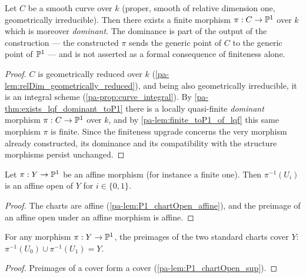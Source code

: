 \begin{theorem}
  \label{pa-thm:exists_finite_dominant_toP1}
  \leanok

  Let \(C\) be a smooth curve over \(k\) (proper, smooth of relative dimension one,
  geometrically irreducible). Then there exists a finite morphism \(\pi : C \to \mathbb{P}^1\)
  over \(k\) which is moreover \emph{dominant}. The dominance is part of the output of the
  construction --- the constructed \(\pi\) sends the generic point of \(C\) to the generic
  point of \(\mathbb{P}^1\) --- and is not asserted as a formal consequence of finiteness alone.
\end{theorem}
\begin{proof}
  \leanok
  \(C\) is geometrically reduced over \(k\) (\ref{pa-lem:relDim_geometrically_reduced}), and
  being also geometrically irreducible, it is an integral scheme
  (\ref{pa-prop:curve_integral}). By \ref{pa-thm:exists_lqf_dominant_toP1} there is a locally
  quasi-finite \emph{dominant} morphism \(\pi : C \to \mathbb{P}^1\) over \(k\), and by
  \ref{pa-lem:finite_toP1_of_lqf} this same morphism \(\pi\) is finite. Since the finiteness
  upgrade concerns the very morphism already constructed, its dominance and its
  compatibility with the structure morphisms persist unchanged.
\end{proof}

\begin{lemma}
  \label{pa-lem:preimage_chart_affine}
  \leanok

  Let \(\pi : Y \to \mathbb{P}^1\) be an affine morphism (for instance a finite one). Then
  \(\pi^{-1}(U_i)\) is an affine open of \(Y\) for \(i \in \{0,1\}\).
\end{lemma}
\begin{proof}
  \leanok
  The charts are affine (\ref{pa-lem:P1_chartOpen_affine}), and the preimage of an affine open
  under an affine morphism is affine.
\end{proof}

\begin{lemma}
  \label{pa-lem:preimage_chart_sup}
  \leanok

  For any morphism \(\pi : Y \to \mathbb{P}^1\), the preimages of the two standard charts cover
  \(Y\): \(\pi^{-1}(U_0) \cup \pi^{-1}(U_1) = Y\).
\end{lemma}
\begin{proof}
  \leanok
  Preimages of a cover form a cover (\ref{pa-lem:P1_chartOpen_sup}).
\end{proof}

